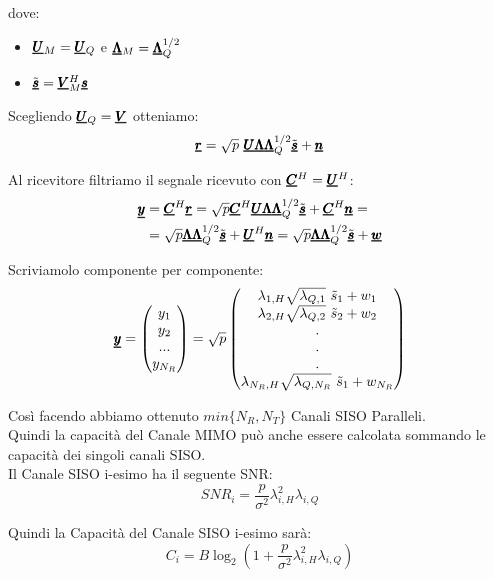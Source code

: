 dove:
\begin{itemize}
    \item $\pmb{\underline{U}}_M = \pmb{\underline{U}}_Q$ e $\pmb{\underline{\Lambda}}_M = \pmb{\underline{\Lambda}}_Q^{1/2}$
    \item $\tilde{\pmb{\underline{s}}} = \pmb{\underline{V}}_{M}^H \pmb{\underline{s}}$
\end{itemize}

Scegliendo $\pmb{\underline{U}}_Q = \pmb{\underline{V}}$ otteniamo:
\begin{equation*}
    \pmb{\underline{r}} = \sqrt{p} \ \pmb{\underline{U}} \pmb{\underline{\Lambda}} \pmb{\underline{\Lambda}}_Q^{1/2} \tilde{\pmb{\underline{s}}} + \pmb{\underline{n}}
\end{equation*}

Al ricevitore filtriamo il segnale ricevuto con $\pmb{\underline{C}}^H = \pmb{\underline{U}}^H$:\\

\begin{equation*}
\begin{aligned}
     \pmb{\underline{y}} &= \pmb{\underline{C}}^H \pmb{\underline{r}} = \sqrt{p} \pmb{\underline{C}}^H \pmb{\underline{U}} \pmb{\underline{\Lambda}} \pmb{\underline{\Lambda}}_Q^{1/2} \tilde{\pmb{\underline{s}}} + \pmb{\underline{C}}^H \pmb{\underline{n}} = \\
     &= \sqrt{p} \pmb{\underline{\Lambda}} \pmb{\underline{\Lambda}}_Q^{1/2} \tilde{\pmb{\underline{s}}} + \pmb{\underline{U}}^H \pmb{\underline{n}} = \sqrt{p} \pmb{\underline{\Lambda}} \pmb{\underline{\Lambda}}_Q^{1/2} \tilde{\pmb{\underline{s}}} + \pmb{\underline{w}}
\end{aligned}
\end{equation*}

Scriviamolo componente per componente:\\
\begin{equation*}
    \pmb{\underline{y}} = \begin{pmatrix}
    y_1 \\ y_2 \\ ... \\ y_{N_R}
    \end{pmatrix} = \sqrt{p} \begin{pmatrix}
    \lambda_{1,H} \sqrt{\lambda_{Q,1}} \ \tilde{s}_1 + w_1 \\
    \lambda_{2,H} \sqrt{\lambda_{Q,2}} \ \tilde{s}_2 + w_2 \\
    .\\.\\.\\
    \lambda_{N_R,H} \sqrt{\lambda_{Q,N_R}} \ \tilde{s}_1 + w_{N_R}
    \end{pmatrix}
\end{equation*}

Così facendo abbiamo ottenuto $min\{N_R, N_T\}$ Canali SISO Paralleli.\\

Quindi la capacità del Canale MIMO può anche essere calcolata sommando le capacità dei singoli canali SISO.\\

Il Canale SISO i-esimo ha il seguente SNR:
\begin{equation*}
    SNR_i = \frac{p}{\sigma^2} \lambda_{i,H}^2 \lambda_{i,Q}
\end{equation*}

Quindi la Capacità del Canale SISO i-esimo sarà:
\begin{equation*}
    C_i = B\log_2\left(1 + \frac{p}{\sigma^2} \lambda_{i,H}^2 \lambda_{i,Q} \right)
\end{equation*}
